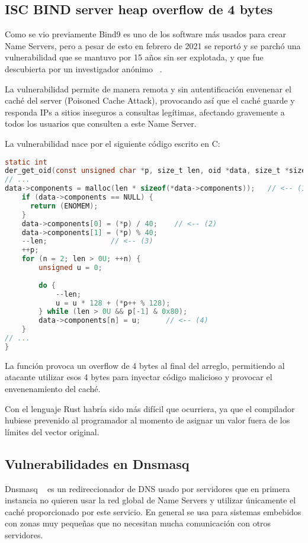 \subsection{ISC BIND server heap overflow de 4 bytes}
Como se vio previamente Bind9 es uno de los software más usados para crear Name Servers, pero a pesar de esto en febrero de 2021 se reportó y se parchó una vulnerabilidad que se mantuvo por 15 años sin ser explotada, y que fue descubierta por un investigador anónimo ~\cite{VulnerabilidadBind}.

La vulnerabilidad permite de manera remota y sin autentificación envenenar el caché del server (Poisoned Cache Attack), provocando así que el caché guarde y responda IPs a sitios inseguros a consultas legítimas, afectando gravemente a todos los usuarios que consulten a este Name Server.


La vulnerabilidad nace por el siguiente código escrito en C:
\begin{lstlisting}[language=C]
static int 
der_get_oid(const unsigned char *p, size_t len, oid *data, size_t *size) { 
// ... 
data->components = malloc(len * sizeof(*data->components));   // <-- (1) 
    if (data->components == NULL) { 
      return (ENOMEM); 
    } 
    data->components[0] = (*p) / 40;    // <-- (2) 
    data->components[1] = (*p) % 40; 
    --len;               // <-- (3) 
    ++p; 
    for (n = 2; len > 0U; ++n) { 
        unsigned u = 0; 
 
        do { 
            --len; 
            u = u * 128 + (*p++ % 128); 
        } while (len > 0U && p[-1] & 0x80); 
        data->components[n] = u;      // <-- (4) 
    } 
// ... 
}
\end{lstlisting}

La función provoca un overflow de 4 bytes al final del arreglo, permitiendo al atacante utilizar esos 4 bytes para inyectar código malicioso y 
provocar el envenenamiento del caché.

Con el lenguaje Rust habría sido más difícil que ocurriera, ya que el compilador hubiese prevenido al programador al momento de asignar un valor 
fuera de los límites del vector original.

\subsection{Vulnerabilidades en Dnsmasq}

Dnsmasq ~\cite{Dnsmasq} es un redireccionador de DNS usado por servidores que en primera instancia no quieren usar la red global de Name Servers 
y utilizar únicamente el caché proporcionado por este servicio. En general se usa para sistemas embebidos con zonas muy pequeñas que no necesitan
 mucha comunicación con otros servidores.

